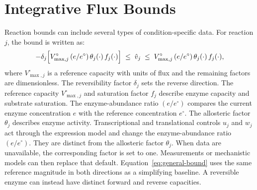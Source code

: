 \section{Integrative Flux Bounds}\label{sec:gateways}

Reaction bounds can include several types of condition-specific data. For
reaction $j$, the bound is written as:
\begin{equation}\label{eq:general-bound}
  -\delta_j\Bigl[V^{\circ}_{\max,j}\,(e/e^{\circ})\,\theta_j(\cdot)\,f_j(\cdot)\Bigr]
  \;\le\; \hat v_j \;\le\;
  V^{\circ}_{\max,j}\,(e/e^{\circ})\,\theta_j(\cdot)\,f_j(\cdot),
\end{equation}
where $V^{\circ}_{\max,j}$ is a reference capacity with units of flux and the
remaining factors are dimensionless. The reversibility factor $\delta_j$ sets
the reverse direction. The reference capacity $V^{\circ}_{\max,j}$ and
saturation factor $f_j$ describe enzyme capacity and substrate saturation.
The enzyme-abundance ratio $(e/e^{\circ})$ compares the current enzyme
concentration $e$ with the reference concentration $e^{\circ}$. The
allosteric factor $\theta_j$ describes enzyme activity.
Transcriptional and translational controls $u_j$ and $w_j$ act through the
expression model and change the enzyme-abundance ratio $(e/e^{\circ})$. They
are distinct from the allosteric factor $\theta_j$. When data are unavailable,
the corresponding factor is set to one. Measurements or mechanistic models
can then replace that default.
Equation~\eqref{eq:general-bound} uses the same reference magnitude in both
directions as a simplifying baseline. A reversible enzyme can instead have
distinct forward and reverse capacities.

